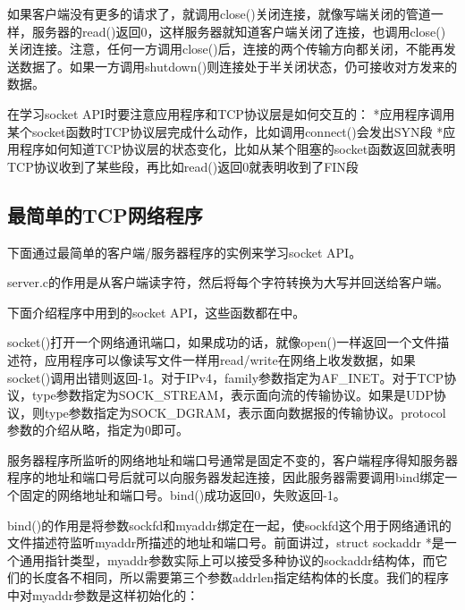 如果客户端没有更多的请求了，就调用close()关闭连接，就像写端关闭的管道一样，服务器的read()返回0，这样服务器就知道客户端关闭了连接，也调用close()关闭连接。注意，任何一方调用close()后，连接的两个传输方向都关闭，不能再发送数据了。如果一方调用shutdown()则连接处于半关闭状态，仍可接收对方发来的数据。



在学习socket API时要注意应用程序和TCP协议层是如何交互的： *应用程序调用某个socket函数时TCP协议层完成什么动作，比如调用connect()会发出SYN段 *应用程序如何知道TCP协议层的状态变化，比如从某个阻塞的socket函数返回就表明TCP协议收到了某些段，再比如read()返回0就表明收到了FIN段


\subsection{最简单的TCP网络程序}
%


下面通过最简单的客户端/服务器程序的实例来学习socket API。



server.\BookSplit{}c的作用是从客户端读字符，然后将每个字符转换为大写并回送给客户端。




下面介绍程序中用到的socket API，这些函数都在中。




socket()打开一个网络通讯端口，如果成功的话，就像open()一样返回一个文件描述符，应用程序可以像读写文件一样用read/\BookSplit{}write在网络上收发数据，如果socket()调用出错则返回-1。对于IPv4，family参数指定为AF\_\BookSplit{}INET。对于TCP协议，type参数指定为SOCK\_\BookSplit{}STREAM，表示面向流的传输协议。如果是UDP协议，则type参数指定为SOCK\_\BookSplit{}DGRAM，表示面向数据报的传输协议。protocol参数的介绍从略，指定为0即可。




服务器程序所监听的网络地址和端口号通常是固定不变的，客户端程序得知服务器程序的地址和端口号后就可以向服务器发起连接，因此服务器需要调用bind绑定一个固定的网络地址和端口号。bind()成功返回0，失败返回-1。



bind()的作用是将参数sockfd和myaddr绑定在一起，使sockfd这个用于网络通讯的文件描述符监听myaddr所描述的地址和端口号。前面讲过，struct sockaddr *是一个通用指针类型，myaddr参数实际上可以接受多种协议的sockaddr结构体，而它们的长度各不相同，所以需要第三个参数addrlen指定结构体的长度。我们的程序中对myaddr参数是这样初始化的：


